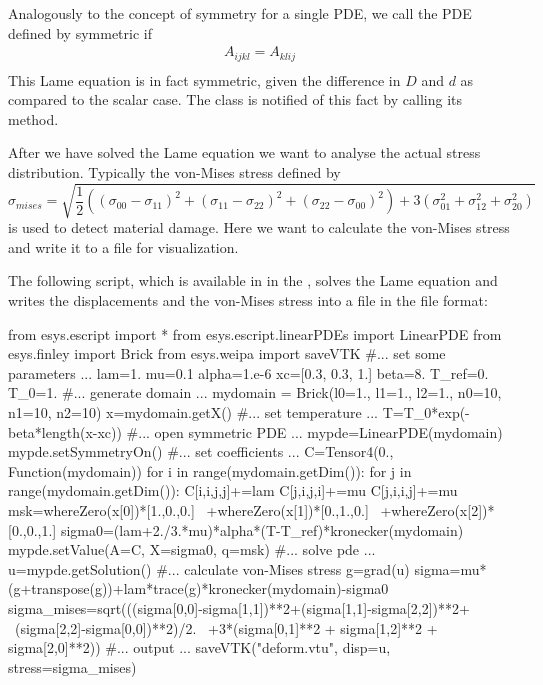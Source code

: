 Analogously to the concept of symmetry for a single PDE, we call the PDE
defined by  symmetric if
\begin{eqnarray}\label{LINEARPDE.SYSTEM.SYMMETRY TUTORIAL}
A_{ijkl} =A_{klij} \\
\end{eqnarray}
This Lame equation is in fact symmetric, given the difference in $D$ and $d$ as compared to the scalar case.
The \LinearPDE class is notified of this fact by calling its  method.

After we have solved the Lame equation we want to analyse the actual stress distribution.
Typically the von-Mises stress defined by
\begin{equation}
\sigma_{mises} = \sqrt{
\frac{1}{2} ((\sigma_{00}-\sigma_{11})^2
            + (\sigma_{11}-\sigma_{22})^2
            + (\sigma_{22}-\sigma_{00})^2)
+ 3( \sigma_{01}^2+\sigma_{12}^2+\sigma_{20}^2) }
\end{equation}
is used to detect material damage.
Here we want to calculate the von-Mises stress and write it to a file for visualization.

The following script, which is available in  in the
\ExampleDirectory, solves the Lame equation and writes the displacements and
the von-Mises stress into a file  in
the \VTK file format:
\begin{python}
  from esys.escript import *
  from esys.escript.linearPDEs import LinearPDE
  from esys.finley import Brick
  from esys.weipa import saveVTK
  #... set some parameters ...
  lam=1.
  mu=0.1
  alpha=1.e-6
  xc=[0.3, 0.3, 1.]
  beta=8.
  T_ref=0.
  T_0=1.
  #... generate domain ...
  mydomain = Brick(l0=1., l1=1., l2=1., n0=10, n1=10, n2=10)
  x=mydomain.getX()
  #... set temperature ...
  T=T_0*exp(-beta*length(x-xc))
  #... open symmetric PDE ...
  mypde=LinearPDE(mydomain)
  mypde.setSymmetryOn()
  #... set coefficients ...
  C=Tensor4(0., Function(mydomain))
  for i in range(mydomain.getDim()):
    for j in range(mydomain.getDim()):
       C[i,i,j,j]+=lam
       C[j,i,j,i]+=mu
       C[j,i,i,j]+=mu
  msk=whereZero(x[0])*[1.,0.,0.] \
     +whereZero(x[1])*[0.,1.,0.] \
     +whereZero(x[2])*[0.,0.,1.]
  sigma0=(lam+2./3.*mu)*alpha*(T-T_ref)*kronecker(mydomain)
  mypde.setValue(A=C, X=sigma0, q=msk)
  #... solve pde ...
  u=mypde.getSolution()
  #... calculate von-Mises stress
  g=grad(u)
  sigma=mu*(g+transpose(g))+lam*trace(g)*kronecker(mydomain)-sigma0
  sigma_mises=sqrt(((sigma[0,0]-sigma[1,1])**2+(sigma[1,1]-sigma[2,2])**2+ \
                    (sigma[2,2]-sigma[0,0])**2)/2. \
                   +3*(sigma[0,1]**2 + sigma[1,2]**2 + sigma[2,0]**2))
  #... output ...
  saveVTK("deform.vtu", disp=u, stress=sigma_mises)
\end{python}


